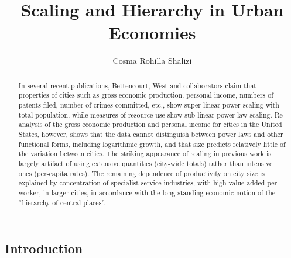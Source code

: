 \documentclass{pnastwo}
\begin{document}
\title{Scaling and Hierarchy in Urban Economies} \author{Cosma Rohilla
  Shalizi}
\maketitle

\begin{article}

\begin{abstract}
  In several recent publications, Bettencourt, West and collaborators claim
  that properties of cities such as gross economic production, personal income,
  numbers of patents filed, number of crimes committed, etc., show super-linear
  power-scaling with total population, while measures of resource use show
  sub-linear power-law scaling.  Re-analysis of the gross economic production
  and personal income for cities in the United States, however, shows that the
  data cannot distinguish between power laws and other functional forms,
  including logarithmic growth, and that size predicts relatively little of the
  variation between cities.  The striking appearance of scaling in previous
  work is largely artifact of using extensive quantities (city-wide totals)
  rather than intensive ones (per-capita rates).  The remaining dependence of
  productivity on city size is explained by concentration of specialist service
  industries, with high value-added per worker, in larger cities, in accordance
  with the long-standing economic notion of the ``hierarchy of central
  places''.
\end{abstract}

\section{Introduction}


\end{article}
\end{document}
